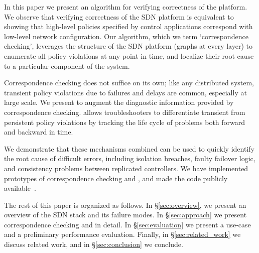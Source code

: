 In this paper we present an algorithm for verifying correctness of the
platform. We observe that verifying correctness of the SDN platform
is equivalent to showing that high-level policies specified by
control applications correspond with low-level network configuration.
Our algorithm, which we term `correspondence checking',
leverages the structure of the SDN platform (graphs at every layer)
to enumerate all policy violations at any point in time, and localize their
root cause to a particular component of the system.

Correspondence checking does not suffice on its own; like any distributed
system, transient policy violations due to failures and delays are 
common, especially at large scale. We present \simulator{}
to augment the diagnostic information provided by correspondence checking.
\Simulator{} allows troubleshooters 
to differentiate transient from persistent policy violations by tracking the life cycle of problems 
both forward and backward in time.

We demonstrate that these mechanisms combined can be used to quickly
identify the root cause of difficult errors, including isolation breaches,
faulty failover logic, and consistency problems between replicated
controllers. We have implemented prototypes
of correspondence checking and \simulator{}, and made the code publicly
available~\cite{github}.

The rest of this paper is organized as follows. In \S\ref{sec:overview},
we present an overview of the SDN stack and its failure modes.
In \S\ref{sec:approach} we present correspondence checking and
\simulator{} in detail. In \S\ref{sec:evaluation} we present
a use-case and a preliminary performance evaluation.
Finally, in \S\ref{sec:related_work} we discuss related work,
and in \S\ref{sec:conclusion} we conclude.
